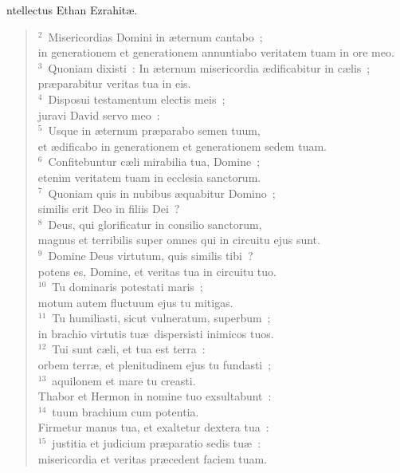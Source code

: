 \bchapter
{}ntellectus Ethan Ezrahit\ae .
\begin{flushleft}\begin{verse}\vspace{6pt}${}^{2}$~Misericordias Domini in \ae ternum cantabo~;\\ in generationem et generationem annuntiabo veritatem tuam in ore meo.\\
${}^{3}$~Quoniam dixisti~: In \ae ternum misericordia \ae dificabitur in c\ae lis~;\\ pr\ae parabitur veritas tua in eis.\\
${}^{4}$~Disposui testamentum electis meis~;\\ juravi David servo meo~:\\
${}^{5}$~Usque in \ae ternum pr\ae parabo semen tuum,\\ et \ae dificabo in generationem et generationem sedem tuam.\\
${}^{6}$~Confitebuntur c\ae li mirabilia tua, Domine~;\\ etenim veritatem tuam in ecclesia sanctorum.\\
${}^{7}$~Quoniam quis in nubibus \ae quabitur Domino~;\\ similis erit Deo in filiis Dei~?\\
${}^{8}$~Deus, qui glorificatur in consilio sanctorum,\\ magnus et terribilis super omnes qui in circuitu ejus sunt.\\
${}^{9}$~Domine Deus virtutum, quis similis tibi~?\\ potens es, Domine, et veritas tua in circuitu tuo.\\
${}^{10}$~Tu dominaris potestati maris~;\\ motum autem fluctuum ejus tu mitigas.\\
${}^{11}$~Tu humiliasti, sicut vulneratum, superbum~;\\ in brachio virtutis tu\ae\ dispersisti inimicos tuos.\\
${}^{12}$~Tui sunt c\ae li, et tua est terra~:\\ orbem terr\ae , et plenitudinem ejus tu fundasti~;\\
${}^{13}$~aquilonem et mare tu creasti.\\ Thabor et Hermon in nomine tuo exsultabunt~:\\
${}^{14}$~tuum brachium cum potentia.\\ Firmetur manus tua, et exaltetur dextera tua~:\\
${}^{15}$~justitia et judicium pr\ae paratio sedis tu\ae~:\\ misericordia et veritas pr\ae cedent faciem tuam.\\

\end{verse}
\end{flushleft}
